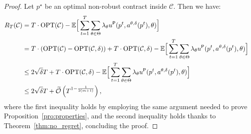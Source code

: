 \NoRegretCor*
\begin{proof}
	Let $p^\star$ be an optimal non-robust contract inside $\mathcal{C}$. Then we have:
	\begin{align*}	
		R_T (\mathcal{C}) & =   T \cdot \textnormal{OPT}(\mathcal{C}) -  \mathbb{E}\Big[\sum_{t=1}^{T} \sum_{\theta \in \Theta} \lambda_\theta u^{\mathsf{P}}(p^t, a^{\theta,\delta}(p^t),\theta)  \Big] \\
		&= T \cdot \left( \textnormal{OPT}(\mathcal{C}) -  \textnormal{OPT}(\mathcal{C}, \delta)\right) + T \cdot \textnormal{OPT}(\mathcal{C}, \delta) -  \mathbb{E}\Big[\sum_{t=1}^{T} \sum_{\theta \in \Theta} \lambda_\theta u^{\mathsf{P}}(p^t, a^{\theta,\delta}(p^t),\theta)  \Big] \\
		&\le 2 \sqrt{\delta} T + T \cdot \textnormal{OPT}(\mathcal{C},\delta)  -  \mathbb{E}\Big[\sum_{t=1}^{T} \sum_{\theta \in \Theta} \lambda_\theta u^{\mathsf{P}}(p^t, a^{\theta,\delta }(p^t),\theta)  \Big]  \\
		& \le 2 \sqrt{\delta} T + \mathcal{\widetilde{O}} \left(   T^{1- \frac{1}{2(m+1)}}  \right) ,
	\end{align*}
	where the first inequality holds by employing the same argument needed to prove Proposition~\ref{pro:properties}, and the second inequality holds thanks to Theorem~\ref{thm:no_regret}, concluding the proof.
\end{proof}






